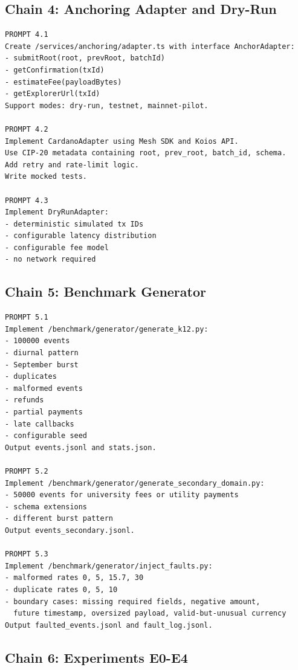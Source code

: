 \documentclass[journal]{IEEEtran}
\begin{document}
\subsection*{Chain 4: Anchoring Adapter and Dry-Run}

\begin{lstlisting}[language={}, basicstyle=\ttfamily\scriptsize]
PROMPT 4.1
Create /services/anchoring/adapter.ts with interface AnchorAdapter:
- submitRoot(root, prevRoot, batchId)
- getConfirmation(txId)
- estimateFee(payloadBytes)
- getExplorerUrl(txId)
Support modes: dry-run, testnet, mainnet-pilot.

PROMPT 4.2
Implement CardanoAdapter using Mesh SDK and Koios API.
Use CIP-20 metadata containing root, prev_root, batch_id, schema.
Add retry and rate-limit logic.
Write mocked tests.

PROMPT 4.3
Implement DryRunAdapter:
- deterministic simulated tx IDs
- configurable latency distribution
- configurable fee model
- no network required
\end{lstlisting}

\subsection*{Chain 5: Benchmark Generator}

\begin{lstlisting}[language={}, basicstyle=\ttfamily\scriptsize]
PROMPT 5.1
Implement /benchmark/generator/generate_k12.py:
- 100000 events
- diurnal pattern
- September burst
- duplicates
- malformed events
- refunds
- partial payments
- late callbacks
- configurable seed
Output events.jsonl and stats.json.

PROMPT 5.2
Implement /benchmark/generator/generate_secondary_domain.py:
- 50000 events for university fees or utility payments
- schema extensions
- different burst pattern
Output events_secondary.jsonl.

PROMPT 5.3
Implement /benchmark/generator/inject_faults.py:
- malformed rates 0, 5, 15.7, 30
- duplicate rates 0, 5, 10
- boundary cases: missing required fields, negative amount,
  future timestamp, oversized payload, valid-but-unusual currency
Output faulted_events.jsonl and fault_log.jsonl.
\end{lstlisting}

\subsection*{Chain 6: Experiments E0-E4}
\end{document}
